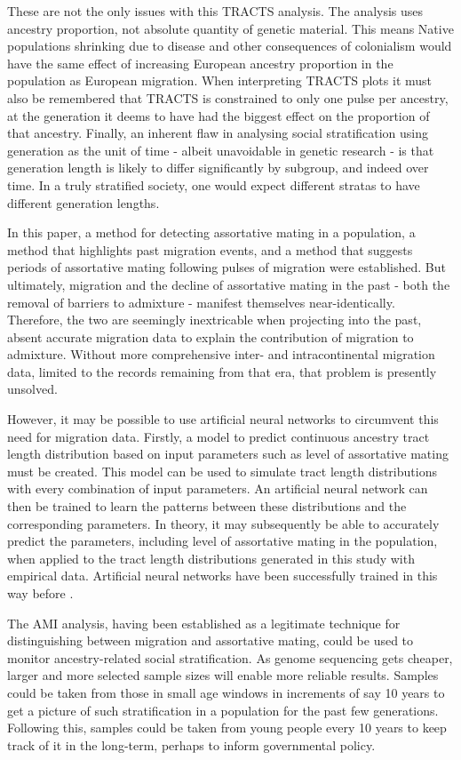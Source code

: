 \documentclass[11pt]{article}
\begin{document}
These are not the only issues with this TRACTS analysis. The analysis uses ancestry proportion, not absolute quantity of genetic material. This means Native populations shrinking due to disease and other consequences of colonialism would have the same effect of increasing European ancestry proportion in the population as European migration. When interpreting TRACTS plots it must also be remembered that TRACTS is constrained to only one pulse per ancestry, at the generation it deems to have had the biggest effect on the proportion of that ancestry. Finally, an inherent flaw in analysing social stratification using generation as the unit of time - albeit unavoidable in genetic research - is that generation length is likely to differ significantly by subgroup, and indeed over time. In a truly stratified society, one would expect different stratas to have different generation lengths. 

In this paper, a method for detecting assortative mating in a population, a method that highlights past migration events, and a method that suggests periods of assortative mating following pulses of migration were established. But ultimately, migration and the decline of assortative mating in the past - both the removal of barriers to admixture - manifest themselves near-identically. Therefore, the two are seemingly inextricable when projecting into the past, absent accurate migration data to explain the contribution of migration to admixture. Without more comprehensive inter- and intracontinental migration data, limited to the records remaining from that era, that problem is presently unsolved.

However, it may be possible to use artificial neural networks to circumvent this need for migration data. Firstly, a model to predict continuous ancestry tract length distribution based on input parameters such as level of assortative mating must be created. This model can be used to simulate tract length distributions with every combination of input parameters. An artificial neural network can then be trained to learn the patterns between these distributions and the corresponding parameters. In theory, it may subsequently be able to accurately predict the parameters, including level of assortative mating in the population, when applied to the tract length distributions generated in this study with empirical data. Artificial neural networks have been successfully trained in this way before \parencite{Sheehan2016}. 

The AMI analysis, having been established as a legitimate technique for distinguishing between migration and assortative mating, could be used to monitor ancestry-related social stratification. As genome sequencing gets cheaper, larger and more selected sample sizes will enable more reliable results. Samples could be taken from those in small age windows in increments of say 10 years to get a picture of such stratification in a population for the past few generations. Following this, samples could be taken from young people every 10 years to keep track of it in the long-term, perhaps to inform governmental policy.
\end{document}
